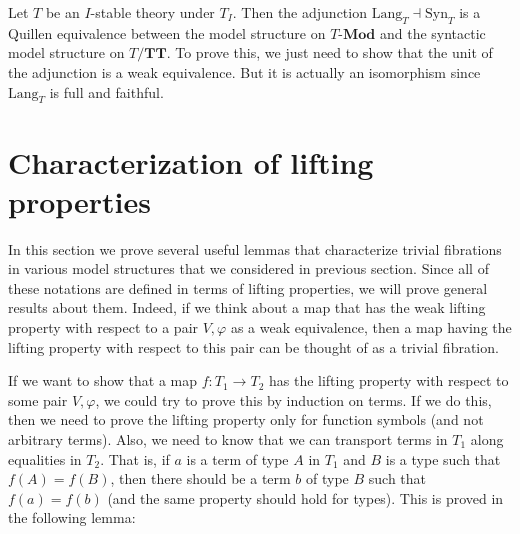 \documentclass[reqno]{amsart}
\theoremstyle{definition}
\theoremstyle{remark}
\newcommand{\cat}[1]{\mathbf{#1}}
\newcommand{\Mod}[1]{#1\text{-}\cat{Mod}}
\newcommand{\algtt}{\cat{TT}}
\newcommand{\Syn}{\mathrm{Syn}}
\newcommand{\Lang}{\mathrm{Lang}}
\numberwithin{figure}{section}
\begin{document}
Let $T$ be an $I$-stable theory under $T_I$.
Then the adjunction $\Lang_T \dashv \Syn_T$ is a Quillen equivalence between the model structure on $\Mod{T}$ and the syntactic model structure on $T/\algtt$.
To prove this, we just need to show that the unit of the adjunction is a weak equivalence.
But it is actually an isomorphism since $\Lang_T$ is full and faithful.

\section{Characterization of lifting properties}
\label{sec:triv-fib}

In this section we prove several useful lemmas that characterize trivial fibrations in various model structures that we considered in previous section.
Since all of these notations are defined in terms of lifting properties, we will prove general results about them.
Indeed, if we think about a map that has the weak lifting property with respect to a pair $V,\varphi$ as a weak equivalence,
then a map having the lifting property with respect to this pair can be thought of as a trivial fibration.

If we want to show that a map $f : T_1 \to T_2$ has the lifting property with respect to some pair $V,\varphi$, we could try to prove this by induction on terms.
If we do this, then we need to prove the lifting property only for function symbols (and not arbitrary terms).
Also, we need to know that we can transport terms in $T_1$ along equalities in $T_2$.
That is, if $a$ is a term of type $A$ in $T_1$ and $B$ is a type such that $f(A) = f(B)$, then there should be a term $b$ of type $B$ such that $f(a) = f(b)$ (and the same property should hold for types).
This is proved in the following lemma:
\end{document}
